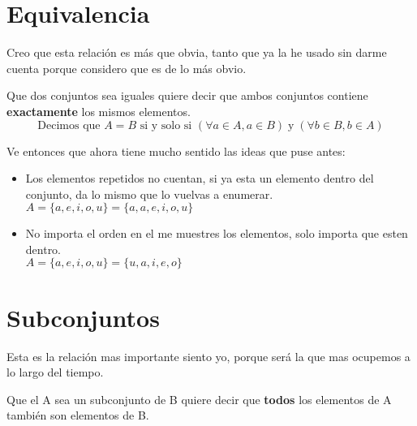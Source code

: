 \documentclass[12pt, fleqn]{report}                             %
\begin{document}
        \section{Equivalencia}

            Creo que esta relación es más que obvia, tanto que ya la he usado sin darme cuenta
            porque considero que es de lo más obvio.

            Que dos conjuntos sea iguales quiere decir que ambos conjuntos contiene
            \textbf{exactamente} los mismos elementos.
            \begin{equation}
                \text{Decimos que }
                A = B 
                \text{ si y solo si }
                (\forall a \in A, a \in B) \;\text{y}\; (\forall b \in B, b \in A)
            \end{equation}

            Ve entonces que ahora tiene mucho sentido las ideas que puse antes:

            \begin{itemize}
                \item Los elementos repetidos no cuentan, si ya esta un elemento dentro del
                    conjunto, da lo mismo que lo vuelvas a enumerar.\\
                    $A = \{a, e, i, o, u\} = \{a, a, e, i, o, u\}$

                \item No importa el orden en el me muestres los elementos,
                    solo importa que esten dentro.\\
                    $A = \{a, e, i, o, u\} = \{u, a, i, e, o\}$
            \end{itemize}


        \clearpage
        \section{Subconjuntos}

            Esta es la relación mas importante siento yo, porque será la que mas ocupemos a lo largo
            del tiempo.

            Que el A sea un subconjunto de B quiere decir que \textbf{todos} los elementos de A
            también son elementos de B.
\end{document}
